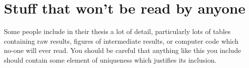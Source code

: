 \documentclass[12pt,a4paper]{report}
\numberwithin{equation}{section}
\theoremstyle{definition}
\theoremstyle{theorem}
\theoremstyle{theorem}
\theoremstyle{example}
\theoremstyle{definition}
\begin{document}
\chapter{Stuff that won't be read by anyone}

Some people include in their thesis a lot of detail, particularly lots
of tables containing raw results, figures of intermediate results, or
computer code which no-one will ever read. You should be careful that
anything like this you include should contain some element of
uniqueness which justifies its inclusion.




\end{document}
